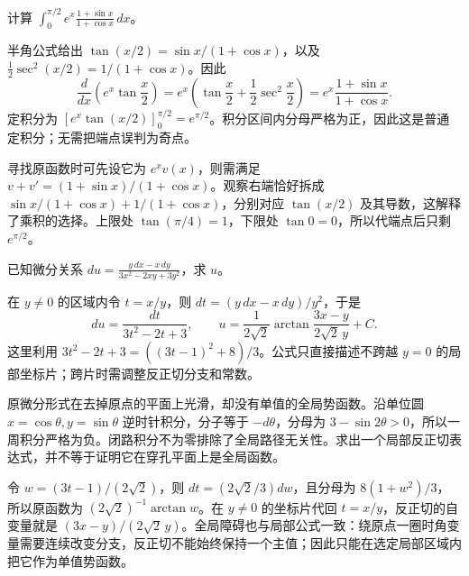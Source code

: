 \documentclass[12pt,fontset=fandol]{ctexart}
\begin{document}
\begin{example}\label{nm-2019-1c}
计算 $\displaystyle\int_0^{\pi/2}e^x\frac{1+\sin x}{1+\cos x}\,dx$。
\end{example}
\begin{solve}
半角公式给出 $\tan(x/2)=\sin x/(1+\cos x)$，以及 $\frac12\sec^2(x/2)=1/(1+\cos x)$。因此
\[
 \frac{d}{dx}\left(e^x\tan\frac x2\right)
 =e^x\left(\tan\frac x2+\frac12\sec^2\frac x2\right)
 =e^x\frac{1+\sin x}{1+\cos x}.
\]
定积分为 $[e^x\tan(x/2)]_0^{\pi/2}=e^{\pi/2}$。积分区间内分母严格为正，因此这是普通定积分；无需把端点误判为奇点。

寻找原函数时可先设它为 $e^xv(x)$，则需满足 $v+v'=(1+\sin x)/(1+\cos x)$。观察右端恰好拆成 $\sin x/(1+\cos x)+1/(1+\cos x)$，分别对应 $\tan(x/2)$ 及其导数，这解释了乘积的选择。上限处 $\tan(\pi/4)=1$，下限处 $\tan0=0$，所以代端点后只剩 $e^{\pi/2}$。

\end{solve}

\begin{example}\label{nm-2019-1d}
已知微分关系 $\displaystyle du=\frac{y\,dx-x\,dy}{3x^2-2xy+3y^2}$，求 $u$。
\end{example}
\begin{solve}
在 $y\ne0$ 的区域内令 $t=x/y$，则 $dt=(y\,dx-x\,dy)/y^2$，于是
\[
 du=\frac{dt}{3t^2-2t+3},\qquad
 u=\frac1{2\sqrt2}\arctan\frac{3x-y}{2\sqrt2\,y}+C.
\]
这里利用 $3t^2-2t+3=((3t-1)^2+8)/3$。公式只直接描述不跨越 $y=0$ 的局部坐标片；跨片时需调整反正切分支和常数。

原微分形式在去掉原点的平面上光滑，却没有单值的全局势函数。沿单位圆 $x=\cos\theta,y=\sin\theta$ 逆时针积分，分子等于 $-d\theta$，分母为 $3-\sin2\theta>0$，所以一周积分严格为负。闭路积分不为零排除了全局路径无关性。求出一个局部反正切表达式，并不等于证明它在穿孔平面上是全局函数。

令 $w=(3t-1)/(2\sqrt2)$，则 $dt=(2\sqrt2/3)dw$，且分母为 $8(1+w^2)/3$，所以原函数为 $(2\sqrt2)^{-1}\arctan w$。在 $y\ne0$ 的坐标片代回 $t=x/y$，反正切的自变量就是 $(3x-y)/(2\sqrt2\,y)$。全局障碍也与局部公式一致：绕原点一圈时角变量需要连续改变分支，反正切不能始终保持一个主值；因此只能在选定局部区域内把它作为单值势函数。

\end{solve}
\end{document}
